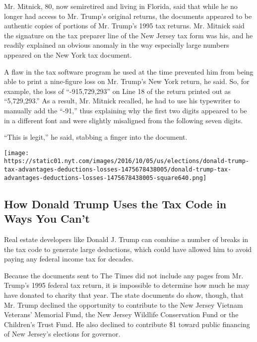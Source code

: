 Mr. Mitnick, 80, now semiretired and living in Florida, said that while
he no longer had access to Mr. Trump's original returns, the documents
appeared to be authentic copies of portions of Mr. Trump's 1995 tax
returns. Mr. Mitnick said the signature on the tax preparer line of the
New Jersey tax form was his, and he readily explained an obvious anomaly
in the way especially large numbers appeared on the New York tax
document.

A flaw in the tax software program he used at the time prevented him
from being able to print a nine-figure loss on Mr. Trump's New York
return, he said. So, for example, the loss of ``-915,729,293'' on Line
18 of the return printed out as ``5,729,293.'' As a result, Mr. Mitnick
recalled, he had to use his typewriter to manually add the ``-91,'' thus
explaining why the first two digits appeared to be in a different font
and were slightly misaligned from the following seven digits.

``This is legit,'' he said, stabbing a finger into the document.

\href{https://www.nytimes.com/interactive/2016/10/07/us/elections/donald-trump-tax-advantages-deductions-losses.html}{}

\texttt{[image: https://static01.nyt.com/images/2016/10/05/us/elections/donald-trump-tax-advantages-deductions-losses-1475678438005/donald-trump-tax-advantages-deductions-losses-1475678438005-square640.png]}

\hypertarget{how-donald-trump-uses-the-tax-code-in-ways-you-cant}{%
\subsection{How Donald Trump Uses the Tax Code in Ways You
Can't}\label{how-donald-trump-uses-the-tax-code-in-ways-you-cant}}

Real estate developers like Donald J. Trump can combine a number of
breaks in the tax code to generate large deductions, which could have
allowed him to avoid paying any federal income tax for decades.

Because the documents sent to The Times did not include any pages from
Mr. Trump's 1995 federal tax return, it is impossible to determine how
much he may have donated to charity that year. The state documents do
show, though, that Mr. Trump declined the opportunity to contribute to
the New Jersey Vietnam Veterans' Memorial Fund, the New Jersey Wildlife
Conservation Fund or the Children's Trust Fund. He also declined to
contribute \$1 toward public financing of New Jersey's elections for
governor.

